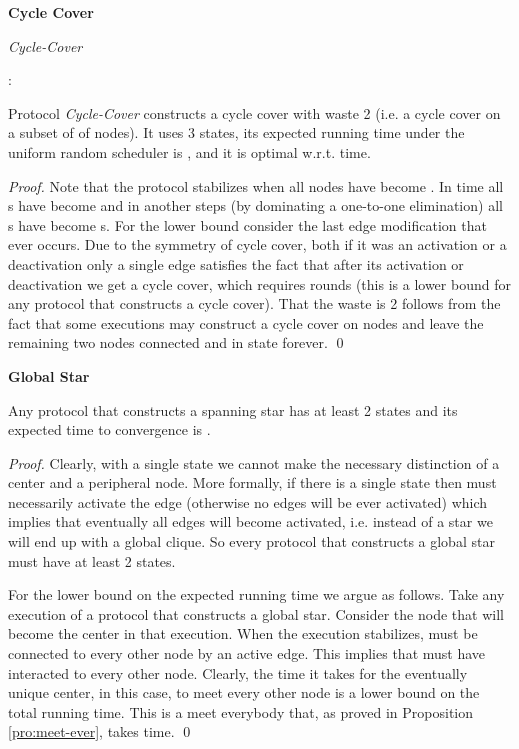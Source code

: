 \documentclass[oribibl, 11pt]{llncs}
\begin{document}
\noindent\textbf{Cycle Cover}

\renewcommand{\algorithmiccomment}[1]{// #1}
\begin{algorithm}[!h]
  \caption{\emph{Cycle-Cover}}\label{prot:cycle-cover}
  \begin{algorithmic}
    \medskip
    \State 
    \State : 
    
  \end{algorithmic}
\end{algorithm}

\begin{theorem} \label{the:cycle-cover}
Protocol \emph{Cycle-Cover} constructs a cycle cover with waste 2 (i.e. a cycle cover on a subset of  of  nodes). It uses 3 states, its expected running time under the uniform random scheduler is , and it is optimal w.r.t. time.
\end{theorem}
\begin{proof}
Note that the protocol stabilizes when all nodes have become . In  time all s have become  and in another  steps (by dominating a one-to-one elimination) all s have become s. For the lower bound consider the last edge modification that ever occurs. Due to the symmetry of cycle cover, both if it was an activation or a deactivation only a single edge satisfies the fact that after its activation or deactivation we get a cycle cover, which requires  rounds (this is a lower bound for any protocol that constructs a cycle cover). That the waste is 2 follows from the fact that some executions may construct a cycle cover on  nodes and leave the remaining two nodes connected and in state  forever.
\qed
\end{proof}

\noindent\textbf{Global Star}

\begin{theorem} 
Any protocol that constructs a spanning star has at least 2 states and its expected time to convergence is .
\end{theorem}
\begin{proof}
Clearly, with a single state we cannot make the necessary distinction of a center and a peripheral node. More formally, if there is a single state  then  must necessarily activate the edge (otherwise no edges will be ever activated) which implies that eventually all edges will become activated, i.e. instead of a star we will end up with a global clique. So every protocol that constructs a global star must have at least 2 states.

For the lower bound on the expected running time we argue as follows. Take any execution of a protocol that constructs a global star. Consider the node  that will become the center in that execution. When the execution stabilizes,  must be connected to every other node by an active edge. This implies that  must have interacted to every other node. Clearly, the time it takes for the eventually unique center,  in this case, to meet every other node is a lower bound on the total running time. This is a meet everybody that, as proved in Proposition \ref{pro:meet-ever}, takes  time.   
\qed
\end{proof}
\end{document}
